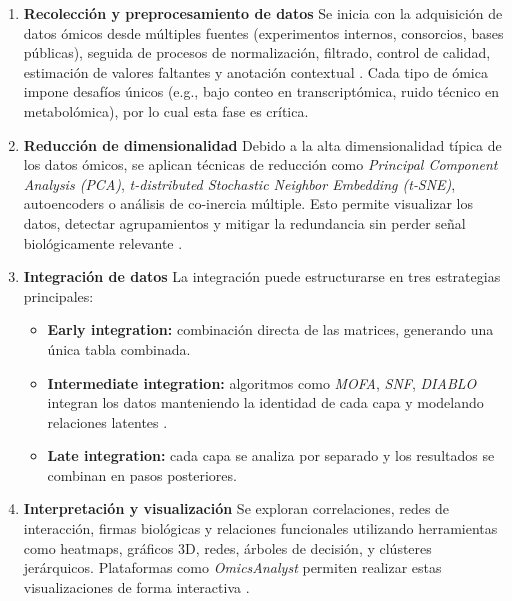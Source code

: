 \begin{enumerate}
    \item \textbf{Recolección y preprocesamiento de datos}
    Se inicia con la adquisición de datos ómicos desde múltiples fuentes (experimentos internos, consorcios, bases públicas), seguida de procesos de normalización, filtrado, control de calidad, estimación de valores faltantes y anotación contextual \cite{Krassowski_Das_Sahu_Misra_2025}. Cada tipo de ómica impone desafíos únicos (e.g., bajo conteo en transcriptómica, ruido técnico en metabolómica), por lo cual esta fase es crítica.

    \item \textbf{Reducción de dimensionalidad}
    Debido a la alta dimensionalidad típica de los datos ómicos, se aplican técnicas de reducción como \textit{Principal Component Analysis (PCA)}, \textit{t-distributed Stochastic Neighbor Embedding (t‑SNE)}, autoencoders o análisis de co-inercia múltiple. Esto permite visualizar los datos, detectar agrupamientos y mitigar la redundancia sin perder señal biológicamente relevante \cite{ramazzotti2022multiomics_dimensionality}.

    \item \textbf{Integración de datos}
    La integración puede estructurarse en tres estrategias principales:
    \begin{itemize}
        \item \textbf{Early integration:} combinación directa de las matrices, generando una única tabla combinada.
        \item \textbf{Intermediate integration:} algoritmos como \textit{MOFA}, \textit{SNF}, \textit{DIABLO} integran los datos manteniendo la identidad de cada capa y modelando relaciones latentes \cite{Argelaguet2018MOFA}.
        \item \textbf{Late integration:} cada capa se analiza por separado y los resultados se combinan en pasos posteriores.
    \end{itemize}

    \item \textbf{Interpretación y visualización}
    Se exploran correlaciones, redes de interacción, firmas biológicas y relaciones funcionales utilizando herramientas como heatmaps, gráficos 3D, redes, árboles de decisión, y clústeres jerárquicos. Plataformas como \textit{OmicsAnalyst} permiten realizar estas visualizaciones de forma interactiva \cite{xia2022omicsanalyst}.


\end{enumerate}

